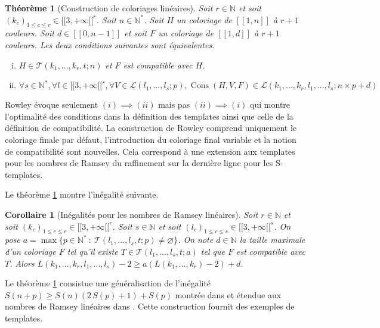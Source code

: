\documentclass{article}
\newtheorem{theorem}[definition]{Théorème}
\newtheorem{corollary}[definition]{Corollaire}
\DeclareMathOperator{\cons}{Cons}
\begin{document}
\begin{theorem}[Construction de coloriages linéaires]
\label{thm:temp}
Soit \(r \in \mathbb{N}\) et soit \((k_c)_{1 \leqslant c \leqslant r} \in {[\![3, +\infty[\![}^r\). Soit \(n \in \mathbb{N}^*\). Soit \(H\) un coloriage de \([\![1,n]\!]\) à \(r + 1\) couleurs. Soit \(d \in [\![0, n - 1]\!]\) et soit \(F\) un coloriage de \([\![1, d]\!]\) à \(r + 1\) couleurs. Les deux conditions suivantes sont équivalentes.

\begin{enumerate}[(i)]
\item \(H \in \mathcal{T}(k_1, ..., k_r, t; n)\) et \(F\) est compatible  avec \(H\).
\item \(\forall s \in \mathbb{N}^*, \forall l \in {[\![3, +\infty[\![}^s, \forall V \in \mathcal{L}(l_1, ..., l_s ; p), \cons(H, V, F) \in  \mathcal{L}(k_1, ..., k_r, l_1, ..., l_s ; n \times p + d)\)
\end{enumerate}
\end{theorem}

Rowley évoque seulement \((i) \implies (ii)\) mais pas \((ii) \implies (i)\) qui montre l'optimalité des conditions dans la définition des templates ainsi que celle de la définition de compatibilité.
La construction de Rowley comprend uniquement le coloriage finale par défaut, l'introduction du coloriage final variable et la notion de compatibilité sont nouvelles. Cela correspond à une extension aux templates pour les nombres de Ramsey du raffinement sur la dernière ligne pour les S-templates.

Le théorème \ref{thm:temp} montre l'inégalité suivante.

\begin{corollary}[Inégalités pour les nombres de Ramsey linéaires]
Soit \(r \in \mathbb{N}\) et soit \((k_c)_{1 \leqslant c \leqslant r} \in {[\![3, +\infty[\![}^r\). Soit \(s \in \mathbb{N}\) et soit \((l_c)_{1 \leqslant c \leqslant s} \in {[\![3, +\infty[\![}^s\). On pose \(a =\max \{p \in \mathbb{N}^* ~:~ \mathcal{T}(l_1, ..., l_s, t; p) \neq \varnothing\}\). On note \(d \in \mathbb{N}\) la taille maximale d'un coloriage \(F\) tel qu'il existe \(T \in \mathcal{T}(l_1, ..., l_s, t; a)\) tel que \(F\) est compatible avec \(T\). Alors \(L(k_1, ..., k_r, l_1, ..., l_s) - 2 \geqslant a (L(k_1, ..., k_r) - 2) + d\).
\end{corollary}

Le théorème \ref{thm:temp} consistue une généralisation de l'inégalité \(S(n + p) \geqslant S(n)  (2 \, S(p) + 1) + S(p)\) montrée dans \cite{AbbottHanson} et étendue aux nombres de Ramsey linéaires dans \cite{rowleyramseyabott}. Cette construction fournit des exemples de templates.
\end{document}
